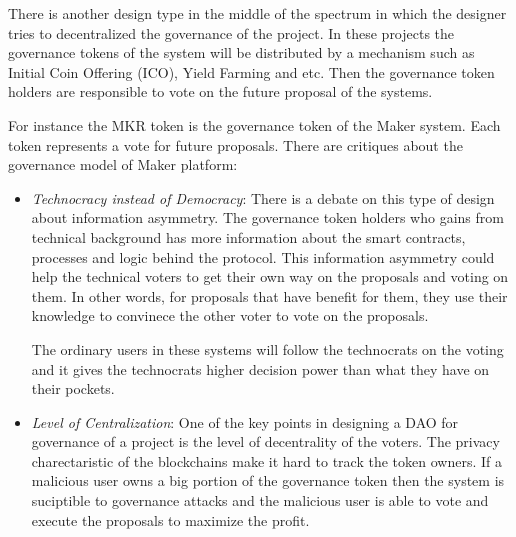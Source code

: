 There is another design type in the middle of the spectrum in which the designer tries to decentralized the governance of the project. In these projects the governance tokens of the system will be distributed by a mechanism such as Initial Coin Offering (ICO), Yield Farming and etc. Then the governance token holders are responsible to vote on the future proposal of the systems.

For instance the MKR token is the governance token of the Maker system. Each token represents a vote for future proposals. There are critiques about the governance model of Maker platform:

\begin{itemize}
	\item \emph{Technocracy instead of Democracy}: There is a debate on this type of design about information asymmetry. The governance token holders who gains from technical background has more information about the smart contracts, processes and logic behind the protocol. This information asymmetry could help the technical voters to get their own way on the proposals and voting on them. In other words, for proposals that have benefit for them, they use their knowledge to convinece the other voter to vote on the proposals.
	
The ordinary users in these systems will follow the technocrats on the voting and it gives the technocrats higher decision power than what they have on their pockets.   
	\item \emph{Level of Centralization}: One of the key points in designing a DAO for governance of a project is the level of decentrality of the voters. The privacy charectaristic of the blockchains make it hard to track the token owners. If a malicious user owns a big portion of the governance token then the system is suciptible to governance attacks and the malicious user is able to vote and execute the proposals to maximize the profit. 
\end{itemize}